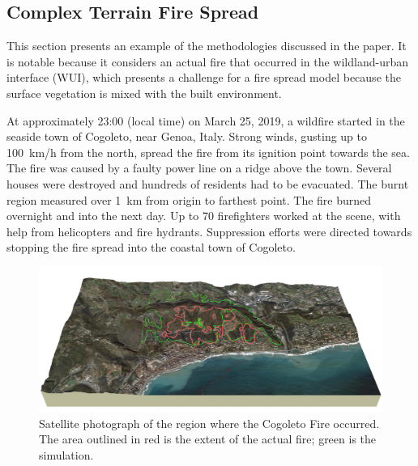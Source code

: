 \documentclass[journal,article,atmosphere,submit,moreauthors,pdftex]{Definitions/mdpi}
\begin{document}
\begin{table}[ht]
\begin{center}
\begin{tabular}{|l|c|c|c|}
\end{tabular}
\end{center}
\end{table}






\subsection{Complex Terrain Fire Spread}  
\label{sec:cogo}

This section presents an example of the methodologies discussed in the paper. It is notable because it considers an actual fire that occurred in the wildland-urban interface (WUI), which presents a challenge for a fire spread model because the surface vegetation is mixed with the built environment.

At approximately 23:00 (local time) on March 25, 2019, a wildfire started in the seaside town of Cogoleto, near Genoa, Italy. Strong winds, gusting up to 100~km/h from the north, spread the fire from its ignition point towards the sea. The fire was caused by a faulty power line on a ridge above the town. Several houses were destroyed and hundreds of residents had to be evacuated. The burnt region measured over 1~km from origin to farthest point. The fire burned overnight and into the next day. Up to 70 firefighters worked at the scene, with help from helicopters and fire hydrants. Suppression efforts were directed towards stopping the fire spread into the coastal town of Cogoleto.

\begin{figure}[ht]
\includegraphics[width=\textwidth]{figures/cogoleto_fire_2019_ls4_1000.png}
\caption{Satellite photograph of the region where the Cogoleto Fire occurred. The area outlined in red is the extent of the actual fire; green is the simulation.}
\label{Cogoleto_satellite}
\end{figure}
\end{document}
